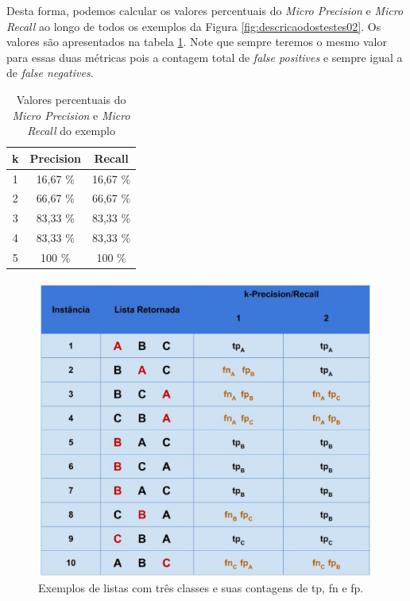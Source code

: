 Desta forma, podemos calcular os valores percentuais do \textit{Micro Precision} e \textit{Micro Recall} ao longo de todos os exemplos da Figura \ref{fig:descricaodostestes02}.
Os valores são apresentados na tabela \ref{tab:valores_micro}.
Note que sempre teremos o mesmo valor para essas duas métricas pois a contagem total de \textit{false positives} e sempre igual a de \textit{false negatives}.

\begin{table}[h!]
  \begin{center}
    \begin{tabular}{ccc}
      \hline
      \textbf{k} & \textbf{Precision} & \textbf{Recall} \\
      \hline

      1 & 16,67 \% & 16,67 \% \\
      2 & 66,67 \% & 66,67 \% \\
      3 & 83,33 \% & 83,33 \% \\
      4 & 83,33 \% & 83,33 \% \\
      5 & 100 \% & 100 \% \\

      \hline
    \end{tabular}
    \caption{Valores percentuais do \textit{Micro Precision} e \textit{Micro Recall} do exemplo}
    \label{tab:valores_micro}
  \end{center}
\end{table}

\begin{figure}[h!]
  \centering
  \includegraphics[width=120mm,scale=0.9]{images/descricaodostestes03.eps}
  \caption{Exemplos de listas com três classes e suas contagens de tp, fn e fp.}
  \label{fig:descricaodostestes03}
\end{figure}

